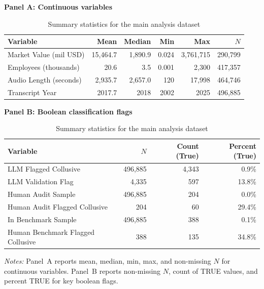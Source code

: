 
\begin{table}[ht]
\centering
\caption{Summary statistics for the main analysis dataset}
\label{tab:summary_stats}
\begin{minipage}{\textwidth}
\raggedright
\vspace{0.5em}
\textbf{Panel A: Continuous variables} \\[0.25em]
\begin{tabular*}{\textwidth}{@{\extracolsep{\fill}}lrrrrr}
\toprule
Variable & Mean & Median & Min & Max & $N$ \\
\midrule
Market Value (mil USD) & 15,464.7 & 1,890.9 & 0.024 & 3,761,715 & 290,799 \\
Employees (thousands) & 20.6 & 3.5 & 0.001 & 2,300 & 417,357 \\
Audio Length (seconds) & 2,935.7 & 2,657.0 & 120 & 17,998 & 464,746 \\
Transcript Year & 2017.7 & 2018 & 2002 & 2025 & 496,885 \\
\bottomrule
\end{tabular*}

\vspace{1.5em}
\textbf{Panel B: Boolean classification flags} \\[0.25em]
\begin{tabular*}{\textwidth}{@{\extracolsep{\fill}}lrrr}
\toprule
Variable & $N$ & Count (True) & Percent (True) \\
\midrule
LLM Flagged Collusive & 496,885 & 4,343 & 0.9\% \\
LLM Validation Flag & 4,335 & 597 & 13.8\% \\
Human Audit Sample & 496,885 & 204 & 0.0\% \\
Human Audit Flagged Collusive & 204 & 60 & 29.4\% \\
In Benchmark Sample & 496,885 & 388 & 0.1\% \\
Human Benchmark Flagged Collusive & 388 & 135 & 34.8\% \\
\bottomrule
\end{tabular*}\end{minipage}
\begin{minipage}{\textwidth}
\vspace{1em}
\footnotesize
\textit{Notes:} Panel~A reports mean, median, min, max, and non-missing $N$ for continuous variables.
Panel~B reports non-missing $N$, count of TRUE values, and percent TRUE for key boolean flags.
\end{minipage}
\end{table}